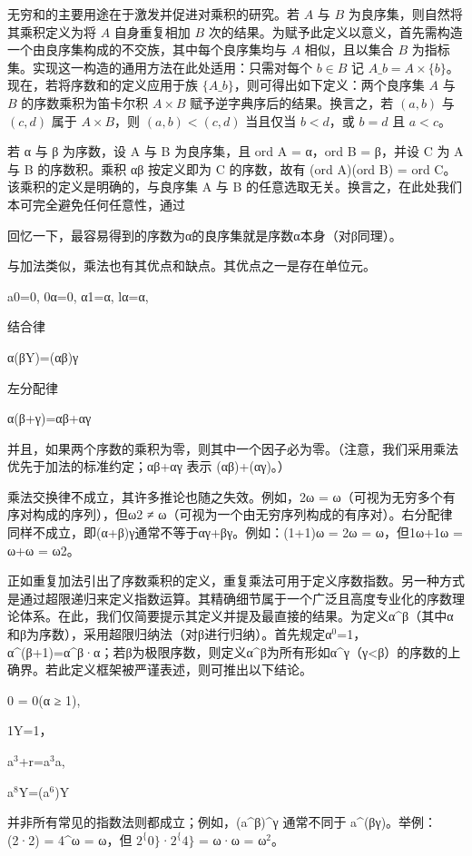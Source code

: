 \documentclass[12pt,a4paper]{ctexbook}
\theoremstyle{definition}
\theoremstyle{remark}
\begin{document}
{无穷和的主要用途在于激发并促进对乘积的研究。若 \(A\) 与 \(B\) 为良序集，则自然将其乘积定义为将 \(A\) 自身重复相加 \(B\) 次的结果。为赋予此定义以意义，首先需构造一个由良序集构成的不交族，其中每个良序集均与 \(A\) 相似，且以集合 \(B\) 为指标集。实现这一构造的通用方法在此处适用：只需对每个 \(b \in B\) 记 \(A\_b = A \times \{b\}\)。现在，若将序数和的定义应用于族 \(\{A\_b\}\)，则可得出如下定义：两个良序集 \(A\) 与 \(B\) 的序数乘积为笛卡尔积 \(A \times B\) 赋予逆字典序后的结果。换言之，若 \((a,b)\) 与 \((c,d)\) 属于 \(A \times B\)，则 \((a,b) < (c,d)\) 当且仅当 \(b < d\)，或 \(b = d\) 且 \(a < c\)。

若 α 与 β 为序数，设 A 与 B 为良序集，且 ord A = α，ord B = β，并设 C 为 A 与 B 的序数积。乘积 αβ 按定义即为 C 的序数，故有 (ord A)(ord B) = ord C。该乘积的定义是明确的，与良序集 A 与 B 的任意选取无关。换言之，在此处我们本可完全避免任何任意性，通过

回忆一下，最容易得到的序数为α的良序集就是序数α本身（对β同理）。

与加法类似，乘法也有其优点和缺点。其优点之一是存在单位元。

a0=0, 0α=0, α1=α, lα=α,

结合律

α(βY)=(αβ)γ

左分配律

α(β+γ)=αβ+αγ

并且，如果两个序数的乘积为零，则其中一个因子必为零。（注意，我们采用乘法优先于加法的标准约定；αβ+αγ 表示 (αβ)+(αγ)。）

乘法交换律不成立，其许多推论也随之失效。例如，2ω = ω（可视为无穷多个有序对构成的序列），但ω2 ≠ ω（可视为一个由无穷序列构成的有序对）。右分配律同样不成立，即(α+β)γ通常不等于αγ+βγ。例如：(1+1)ω = 2ω = ω，但1ω+1ω = ω+ω = ω2。

正如重复加法引出了序数乘积的定义，重复乘法可用于定义序数指数。另一种方式是通过超限递归来定义指数运算。其精确细节属于一个广泛且高度专业化的序数理论体系。在此，我们仅简要提示其定义并提及最直接的结果。为定义α^β（其中α和β为序数），采用超限归纳法（对β进行归纳）。首先规定α$^{0}$=1，α^(β+1)=α^β·α；若β为极限序数，则定义α^β为所有形如α^γ（γ<β）的序数的上确界。若此定义框架被严谨表述，则可推出以下结论。

0 = 0(α ≥ 1),

1Y=1，

a$^{3}$+r=a$^{3}$a,

a$^{8}$Y=(a$^{6}$)Y

并非所有常见的指数法则都成立；例如，(a^β)^γ 通常不同于 a^(βγ)。举例：(2·2) = 4^ω = ω，但 $2^\{0\}$·$2^\{4\}$ = ω·ω = ω$^{2}$。

}
\end{document}
